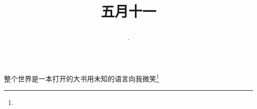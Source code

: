 \title{\date[d=16,m=6,y=2024][year:cn-y,年,month:cn,day:cn,日,·,weekday]·五月十一 }
整个世界是一本打开的大书用未知的语言向我微笑\footnote{ }

